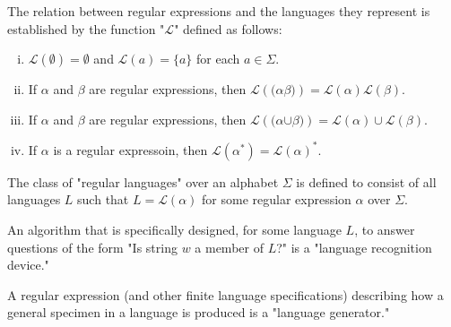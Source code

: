 \documentclass[a4paper,8pt]{article}
\begin{document}
\begin{outline}
    The relation between regular expressions and the languages they represent is established by the function
    "\(\mathcal{L}\)" defined as follows:
    \begin{enumerate}[i.]
      \item
        \(\mathcal{L}(\pmb{\emptyset}) = \emptyset\) and \(\mathcal{L}(a)=\{a\}\) for each \(a \in \Sigma\).
      \item
        If \(\alpha\) and \(\beta\) are regular expressions, then
        \(\mathcal{L}(\pmb{(}\alpha\beta\pmb{)}) = \mathcal{L}(\alpha)\mathcal{L}(\beta)\).
      \item
        If \(\alpha\) and \(\beta\) are regular expressions, then
        \(\mathcal{L}(\pmb{(}\alpha\pmb{\cup}\beta\pmb{)}) = \mathcal{L}(\alpha)\cup\mathcal{L}(\beta)\).
      \item
        If \(\alpha\) is a regular expressoin, then \(\mathcal{L}(\alpha^{\pmb{*}}) = \mathcal{L}(\alpha)^*\).
    \end{enumerate}

    The class of "regular languages" over an alphabet \(\Sigma\) is defined to consist of all languages \(L\) such
    that \(L = \mathcal{L}(\alpha)\) for some regular expression \(\alpha\) over \(\Sigma\).

    An algorithm that is specifically designed, for some language \(L\), to answer questions of the form
    "Is string \(w\) a member of \(L\)?" is a "language recognition device."

    A regular expression (and other finite language specifications) describing how a general specimen in a language is
    produced is a "language generator."

\end{outline}
\end{document}
